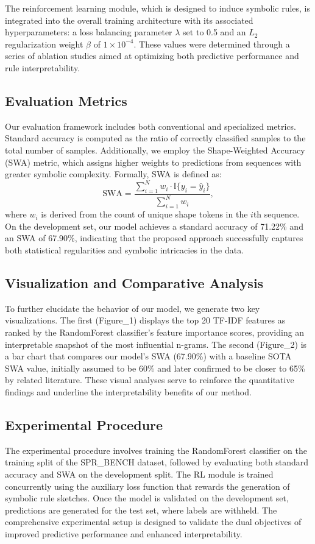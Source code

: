 \documentclass{article}
\begin{document}
The reinforcement learning module, which is designed to induce symbolic rules, is integrated into the overall training architecture with its associated hyperparameters: a loss balancing parameter \(\lambda\) set to 0.5 and an \(L_2\) regularization weight \(\beta\) of \(1 \times 10^{-4}\). These values were determined through a series of ablation studies aimed at optimizing both predictive performance and rule interpretability.

\subsection{Evaluation Metrics}
Our evaluation framework includes both conventional and specialized metrics. Standard accuracy is computed as the ratio of correctly classified samples to the total number of samples. Additionally, we employ the Shape-Weighted Accuracy (SWA) metric, which assigns higher weights to predictions from sequences with greater symbolic complexity. Formally, SWA is defined as:
\[
\text{SWA} = \frac{\sum_{i=1}^{N} w_i \cdot \mathbb{I}\{y_i = \hat{y}_i\}}{\sum_{i=1}^{N} w_i},
\]
where \(w_i\) is derived from the count of unique shape tokens in the \(i\)th sequence. On the development set, our model achieves a standard accuracy of 71.22\% and an SWA of 67.90\%, indicating that the proposed approach successfully captures both statistical regularities and symbolic intricacies in the data.

\subsection{Visualization and Comparative Analysis}
To further elucidate the behavior of our model, we generate two key visualizations. The first (Figure\_1) displays the top 20 TF-IDF features as ranked by the RandomForest classifier's feature importance scores, providing an interpretable snapshot of the most influential n-grams. The second (Figure\_2) is a bar chart that compares our model's SWA (67.90\%) with a baseline SOTA SWA value, initially assumed to be 60\% and later confirmed to be closer to 65\% by related literature. These visual analyses serve to reinforce the quantitative findings and underline the interpretability benefits of our method.

\subsection{Experimental Procedure}
The experimental procedure involves training the RandomForest classifier on the training split of the SPR\_BENCH dataset, followed by evaluating both standard accuracy and SWA on the development split. The RL module is trained concurrently using the auxiliary loss function that rewards the generation of symbolic rule sketches. Once the model is validated on the development set, predictions are generated for the test set, where labels are withheld. The comprehensive experimental setup is designed to validate the dual objectives of improved predictive performance and enhanced interpretability.
\end{document}
